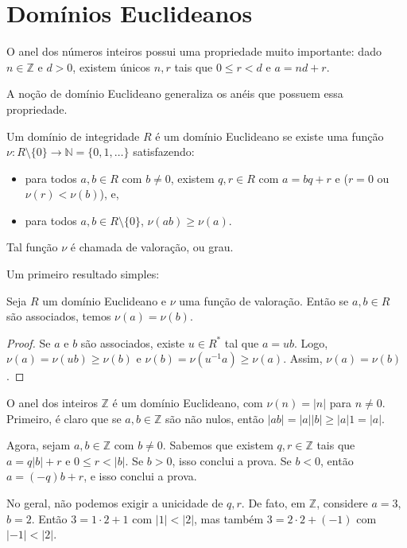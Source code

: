 \section{Domínios Euclideanos}
O anel dos números inteiros possui uma propriedade muito importante:
dado $n\in \mathbb Z$ e $d>0$, existem únicos $n, r$ tais que $0\leq r < d$ e $a=nd+r$.

A noção de domínio Euclideano generaliza os anéis que possuem essa propriedade.

\begin{definition}
    Um domínio de integridade $R$ é um domínio Euclideano
    se existe uma função $\nu:R\setminus \{0\} \to \mathbb N=\{0, 1, \dots\}$ satisfazendo:
    \begin{itemize}
        \item para todos $a, b \in R$ com $b\neq 0$, existem $q, r \in R$ com $a=bq+r$ e ($r=0$ ou $\nu(r)<\nu(b)$), e,
        \item para todos $a, b \in R\setminus \{0\}$, $\nu(ab)\geq \nu(a)$.
    \end{itemize}

    Tal função $\nu$ é chamada de valoração, ou grau.
\end{definition}
Um primeiro resultado simples:
\begin{definition}
    Seja $R$ um domínio Euclideano e $\nu$ uma função de valoração.
    Então se $a, b \in R$ são associados, temos $\nu(a)=\nu(b)$.
\end{definition}
\begin{proof}
    Se $a$ e $b$ são associados, existe $u \in R^*$ tal que $a=ub$.
    Logo, $\nu(a)=\nu(ub)\geq \nu(b)$ e $\nu(b)=\nu(u^{-1}a)\geq \nu(a)$.
    Assim, $\nu(a)=\nu(b)$.
\end{proof}

\begin{exemplo}
    O anel dos inteiros $\mathbb Z$ é um domínio Euclideano, com $\nu(n)=|n|$ para $n\neq 0$.
    Primeiro, é claro que se $a, b\in \mathbb Z$ são não nulos, então $|ab|=|a||b|\geq |a|1=|a|$.

    Agora, sejam $a, b\in \mathbb Z$ com $b\neq 0$.
    Sabemos que existem $q, r \in \mathbb Z$ tais que $a=q|b| +r$ e $0\leq r < | b| $.
    Se $b>0$, isso conclui a prova.
    Se $b<0$, então $a=(-q)b+r$, e isso conclui a prova.
\end{exemplo}

\begin{exemplo}
    No geral, não podemos exigir a unicidade de $q, r$.
    De fato, em $\mathbb Z$, considere $a=3$, $b=2$.
    Então $3=1\cdot 2+1$ com $|1| <|2| $, mas também $3=2\cdot 2+(-1)$ com $|-1|<|2|$.
\end{exemplo}

